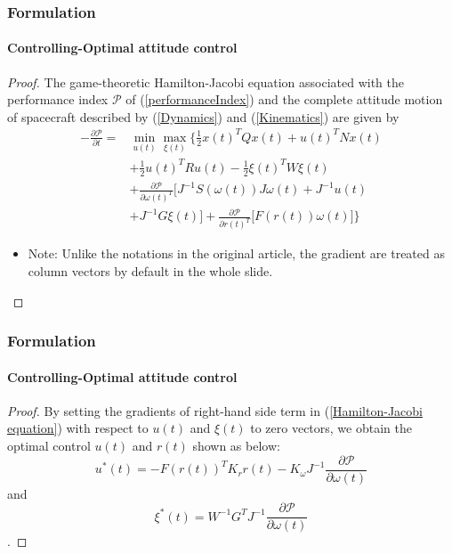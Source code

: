 \documentclass{beamer}
\begin{document}
\begin{frame}
\frametitle{Formulation}
\framesubtitle{Controlling-Optimal attitude control}
\begin{proof}
	The game-theoretic Hamilton-Jacobi equation associated with the performance index $\mathcal{P}$ of (\ref{performanceIndex}) and the complete attitude motion of spacecraft described by (\ref{Dynamics}) and (\ref{Kinematics}) are given by
	\begin{equation}\label{Hamilton-Jacobi equation}
	\begin{split}
	-\frac{\partial \mathcal{P}}{\partial t}=&\min_{u(t)}\max_{\xi(t)}\biggl\{
	\frac{1}{2}x(t)^{T}Qx(t)+u(t)^{T}Nx(t)\\
	&+\frac{1}{2}u(t)^{T}Ru(t)-\frac{1}{2}\xi(t)^{T}W\xi(t)\\
	&+\frac{\partial \mathcal{P}}{\partial \omega(t)^{T}}\bigl[J^{-1}S(\omega(t))J\omega(t)+J^{-1}u(t)\\
	&+J^{-1}G\xi(t)\bigr]+\frac{\partial \mathcal{P}}{\partial r(t)^T}\bigl[F(r(t))\omega(t)\bigr]
	\biggr\}
	\end{split}
	\end{equation}
	\begin{itemize}
		\item Note: Unlike the notations in the original article, the gradient are treated as column vectors by default in the whole slide. 
	\end{itemize}
	
\end{proof}
\end{frame}

\begin{frame}
\frametitle{Formulation}
\framesubtitle{Controlling-Optimal attitude control}
\begin{proof}
	By setting the gradients of right-hand side term in (\ref{Hamilton-Jacobi equation}) with respect to $u(t)$ and $\xi(t)$ to zero vectors, we obtain the optimal control $u(t)$ and $r(t)$ shown as below:
	\begin{equation}\label{uOptimal}
	u^{*}(t)=-F(r(t))^{T}K_{r}r(t)-K_{\omega}J^{-1}\frac{\partial \mathcal{P}}{\partial \omega(t)}
	\end{equation}
	and
	\begin{equation}\label{xiOptimal}
	\xi^{*}(t)=W^{-1}G^{T}J^{-1}\frac{\partial \mathcal{P}}{\partial \omega(t)}
	\end{equation}.
\end{proof}
\end{frame}
\end{document}
